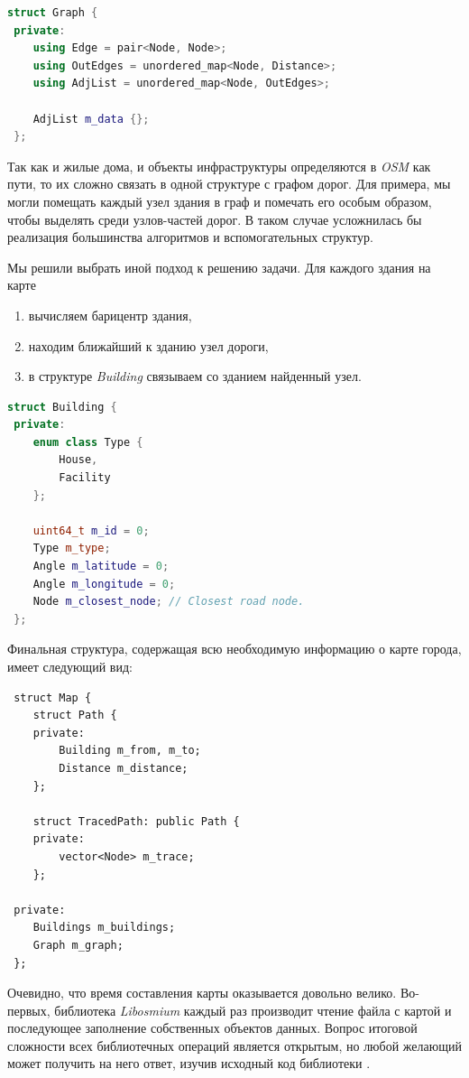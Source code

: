 \documentclass[11pt]{article}
\begin{document}
 	\begin{lstlisting}[language=C++]
 struct Graph {
 private:
	using Edge = pair<Node, Node>;
	using OutEdges = unordered_map<Node, Distance>;
	using AdjList = unordered_map<Node, OutEdges>;

	AdjList m_data {};
 };
 	\end{lstlisting}
 	
 	Так как и жилые дома, и объекты инфраструктуры определяются в \textit{OSM} как пути, то их сложно связать в одной структуре с графом дорог.
 	Для примера, мы могли помещать каждый узел здания в граф и помечать его особым образом, чтобы выделять среди узлов-частей дорог.
 	В таком случае усложнилась бы реализация большинства алгоритмов и вспомогательных структур.
 	
 	Мы решили выбрать иной подход к решению задачи.
	Для каждого здания на карте
	\begin{enumerate}
	\item вычисляем барицентр здания,
	\item находим ближайший к зданию узел дороги,
	\item в структуре \textit{Building} связываем со зданием найденный узел.
	\end{enumerate}
	
	\begin{lstlisting}[language=C++]
 struct Building {
 private:
	enum class Type {
		House,
		Facility
	};

	uint64_t m_id = 0;
	Type m_type;
	Angle m_latitude = 0;
	Angle m_longitude = 0;
	Node m_closest_node; // Closest road node.
 };
	\end{lstlisting}
	
	Финальная структура, содержащая всю необходимую информацию о карте города, имеет следующий вид:
	
	\begin{lstlisting}
 struct Map {
	struct Path {
	private:
		Building m_from, m_to;
		Distance m_distance;
	};

	struct TracedPath: public Path {
	private:
		vector<Node> m_trace;
	};
	
 private:
	Buildings m_buildings;
	Graph m_graph;
 };
	\end{lstlisting}
	
	Очевидно, что время составления карты оказывается довольно велико.
	Во-первых, библиотека \textit{Libosmium} каждый раз производит чтение файла с картой и последующее заполнение собственных объектов данных.
	Вопрос итоговой сложности всех библиотечных операций является открытым, но любой желающий может получить на него ответ, изучив исходный код библиотеки \cite{libosm-code}.
	
\end{document}
